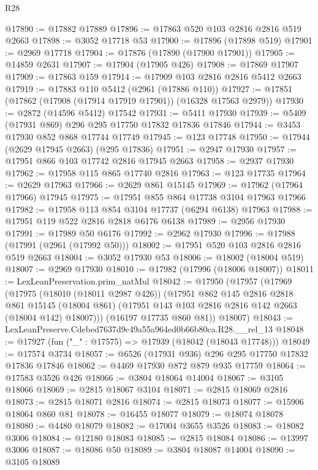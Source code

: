 \begin{lexlean}{R28}
\begin{coremodule}
@17890 := @17882 @17889
@17896 := @17863 @520 @103 @2816 @2816 @519 @2663
@17898 := @3052 @17718 @53
@17900 := @17896 (@17898 @519)
@17901 := @2969 @17718
@17904 := @17876 (@17890 (@17900 @17901))
@17905 := @14859 @2631
@17907 := @17904 (@17905 @426)
@17908 := @17869 @17907
@17909 := @17863 @159
@17914 := @17909 @103 @2816 @2816 @5412 @2663
@17919 := @17883 @110 @5412 (@2961 (@17886 @110))
@17927 := @17851 (@17862 (@17908 (@17914 @17919 @17901)) (@16328 @17563 @2979))
@17930 := @2872 (@14596 @5412) @17542
@17931 := @5411 @17930
@17939 := @5409 (@17931 @869) @296 @295 @17750 @17832 @17836 @17846
@17944 := @3453 @17930 @852 @868 @17744 @17749
@17945 := @123 @17748
@17950 := @17944 (@2629 @17945 @2663) (@295 @17836)
@17951 := @2947 @17930
@17957 := @17951 @866 @103 @17742 @2816 @17945 @2663
@17958 := @2937 @17930
@17962 := @17958 @115 @865 @17740 @2816
@17963 := @123 @17735
@17964 := @2629 @17963
@17966 := @2629 @861 @15145
@17969 := @17962 (@17964 @17966) @17945
@17975 := @17951 @855 @864 @17738 @3104 @17963 @17966
@17982 := @17958 @113 @854 @3104 @17737 (@6294 @6138) @17963
@17988 := @17951 @119 @522 @2816 @2818 @6176 @6138
@17989 := @2956 @17930
@17991 := @17989 @50 @6176
@17992 := @2962 @17930
@17996 := @17988 (@17991 (@2961 (@17992 @50)))
@18002 := @17951 @520 @103 @2816 @2816 @519 @2663
@18004 := @3052 @17930 @53
@18006 := @18002 (@18004 @519)
@18007 := @2969 @17930
@18010 := @17982 (@17996 (@18006 @18007))
@18011 := LexLeanPreservation.prim_natMul
@18042 := @17950
    (@17957
      (@17969
        (@17975
          (@18010 (@18011 @2987 @426))
          (@17951
            @862
            @145
            @2816
            @2818
            @861
            @15145
            (@18004 @861)
            (@17951 @143 @103 @2816 @2816 @142 @2663 (@18004 @142) @18007)))
        (@16197 @17735 @860 @81))
      @18007)
@18043 := LexLeanPreserve.Cdebed7637d9c49a55a964ed0b66b80ca.R28.__rel_13
@18048 := @17927 (fun ("_" : @17575) => @17939 (@18042 (@18043 @17748)))
@18049 := @17574 @3734
@18057 := @6526 (@17931 @936) @296 @295 @17750 @17832 @17836 @17846
@18062 := @4469 @17930 @872 @879 @935 @17759
@18064 := @17583 @3526 @426
@18066 := @3804 @18064 @14004
@18067 := @3105 @18066
@18069 := @2815 @18067 @3104
@18071 := @2815 @18069 @2816
@18073 := @2815 @18071 @2816
@18074 := @2815 @18073
@18077 := @15906 @18064 @860 @81
@18078 := @16455 @18077
@18079 := @18074 @18078
@18080 := @4480 @18079
@18082 := @17004 @3655 @3526
@18083 := @18082 @3006
@18084 := @12180 @18083
@18085 := @2815 @18084
@18086 := @13997 @3006
@18087 := @18086 @50
@18089 := @3804 @18087 @14004
@18090 := @3105 @18089

\end{coremodule}
\end{lexlean}
